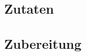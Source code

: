 \documentclass[fontsize=15pt,paper=a4]{scrdoc}
\begin{document}
\section*{}
\vspace{-15pt}
\subsection*{Zutaten}
\begin{multicols}{2}
    \begin{itemize}[left=0pt, label={-}, itemsep=-0.15em]
        
    \end{itemize}
\end{multicols}
\subsection*{Zubereitung}
\begin{enumerate}[left=0pt]
    
\end{enumerate}
\end{document}
